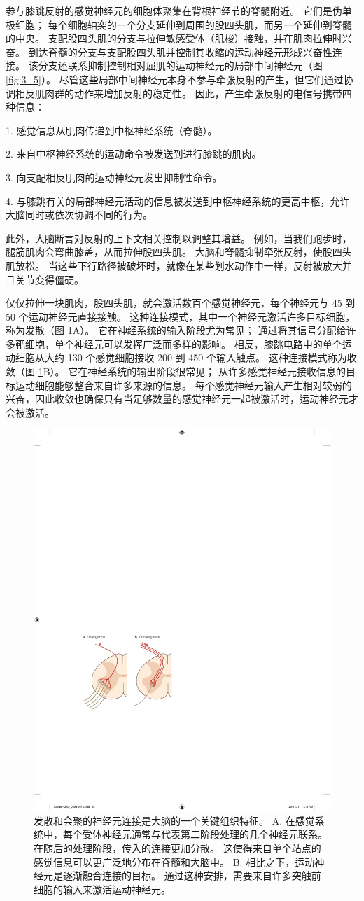 参与膝跳反射的感觉神经元的细胞体聚集在背根神经节的脊髓附近。 
它们是伪单极细胞； 每个细胞轴突的一个分支延伸到周围的股四头肌，而另一个延伸到脊髓的中央。 
支配股四头肌的分支与拉伸敏感受体（肌梭）接触，并在肌肉拉伸时兴奋。 
到达脊髓的分支与支配股四头肌并控制其收缩的运动神经元形成兴奋性连接。 
该分支还联系抑制控制相对屈肌的运动神经元的局部中间神经元（图 \ref{fig:3_5}）。 
尽管这些局部中间神经元本身不参与牵张反射的产生，但它们通过协调相反肌肉群的动作来增加反射的稳定性。 
因此，产生牵张反射的电信号携带四种信息：

1. 感觉信息从肌肉传递到中枢神经系统（脊髓）。

2. 来自中枢神经系统的运动命令被发送到进行膝跳的肌肉。

3. 向支配相反肌肉的运动神经元发出抑制性命令。

4. 与膝跳有关的局部神经元活动的信息被发送到中枢神经系统的更高中枢，允许大脑同时或依次协调不同的行为。

此外，大脑断言对反射的上下文相关控制以调整其增益。 
例如，当我们跑步时，腿筋肌肉会弯曲膝盖，从而拉伸股四头肌。 
大脑和脊髓抑制牵张反射，使股四头肌放松。 
当这些下行路径被破坏时，就像在某些划水动作中一样，反射被放大并且关节变得僵硬。


仅仅拉伸一块肌肉，股四头肌，就会激活数百个感觉神经元，每个神经元与 45 到 50 个运动神经元直接接触。 
这种连接模式，其中一个神经元激活许多目标细胞，称为发散（图 \ref{fig:3_6}A）。 
它在神经系统的输入阶段尤为常见； 通过将其信号分配给许多靶细胞，单个神经元可以发挥广泛而多样的影响。 
相反，膝跳电路中的单个运动细胞从大约 130 个感觉细胞接收 200 到 450 个输入触点。 
这种连接模式称为收敛（图 \ref{fig:3_6}B）。 
它在神经系统的输出阶段很常见； 从许多感觉神经元接收信息的目标运动细胞能够整合来自许多来源的信息。 
每个感觉神经元输入产生相对较弱的兴奋，因此收敛也确保只有当足够数量的感觉神经元一起被激活时，运动神经元才会被激活。


\begin{figure}[htbp]
	\centering
	\includegraphics[width=0.5\linewidth]{chap03/fig_3_6}
	\caption{发散和会聚的神经元连接是大脑的一个关键组织特征。 
		A. 在感觉系统中，每个受体神经元通常与代表第二阶段处理的几个神经元联系。 
		在随后的处理阶段，传入的连接更加分散。 
		这使得来自单个站点的感觉信息可以更广泛地分布在脊髓和大脑中。 
		B. 相比之下，运动神经元是逐渐融合连接的目标。 
		通过这种安排，需要来自许多突触前细胞的输入来激活运动神经元。}
	\label{fig:3_6}
\end{figure}


